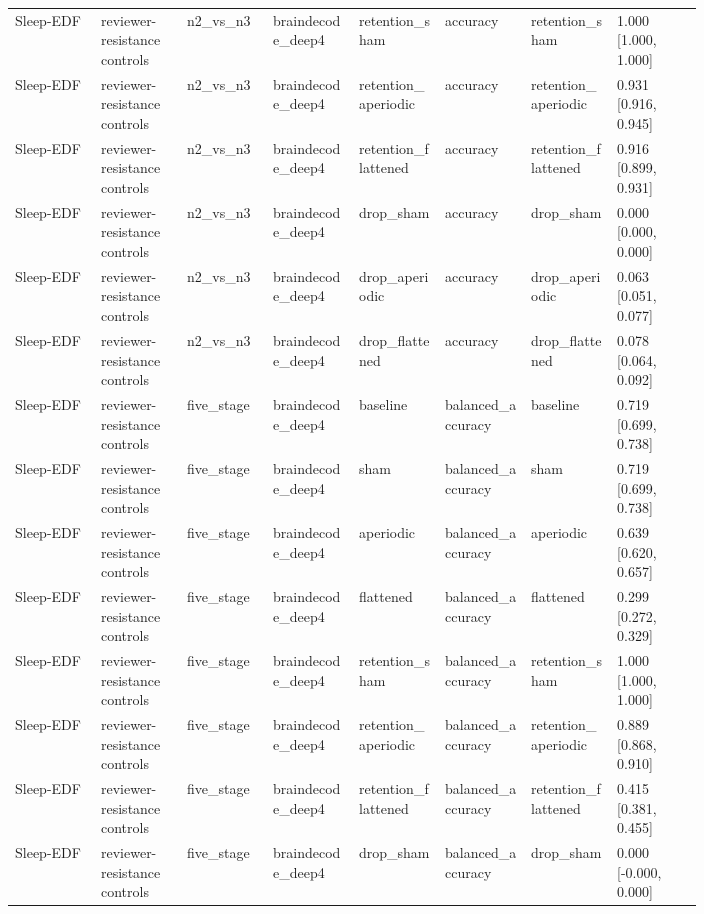 \begin{longtable}{p{0.10\linewidth}p{0.10\linewidth}p{0.10\linewidth}p{0.10\linewidth}p{0.10\linewidth}p{0.10\linewidth}p{0.10\linewidth}p{0.10\linewidth}}
Sleep-EDF & reviewer-resistance controls & n2\_vs\_n3 & braindecode\_deep4 & retention\_sham & accuracy & retention\_sham & 1.000 [1.000, 1.000]\\
Sleep-EDF & reviewer-resistance controls & n2\_vs\_n3 & braindecode\_deep4 & retention\_aperiodic & accuracy & retention\_aperiodic & 0.931 [0.916, 0.945]\\
Sleep-EDF & reviewer-resistance controls & n2\_vs\_n3 & braindecode\_deep4 & retention\_flattened & accuracy & retention\_flattened & 0.916 [0.899, 0.931]\\
Sleep-EDF & reviewer-resistance controls & n2\_vs\_n3 & braindecode\_deep4 & drop\_sham & accuracy & drop\_sham & 0.000 [0.000, 0.000]\\
Sleep-EDF & reviewer-resistance controls & n2\_vs\_n3 & braindecode\_deep4 & drop\_aperiodic & accuracy & drop\_aperiodic & 0.063 [0.051, 0.077]\\
Sleep-EDF & reviewer-resistance controls & n2\_vs\_n3 & braindecode\_deep4 & drop\_flattened & accuracy & drop\_flattened & 0.078 [0.064, 0.092]\\
Sleep-EDF & reviewer-resistance controls & five\_stage & braindecode\_deep4 & baseline & balanced\_accuracy & baseline & 0.719 [0.699, 0.738]\\
Sleep-EDF & reviewer-resistance controls & five\_stage & braindecode\_deep4 & sham & balanced\_accuracy & sham & 0.719 [0.699, 0.738]\\
Sleep-EDF & reviewer-resistance controls & five\_stage & braindecode\_deep4 & aperiodic & balanced\_accuracy & aperiodic & 0.639 [0.620, 0.657]\\
Sleep-EDF & reviewer-resistance controls & five\_stage & braindecode\_deep4 & flattened & balanced\_accuracy & flattened & 0.299 [0.272, 0.329]\\
Sleep-EDF & reviewer-resistance controls & five\_stage & braindecode\_deep4 & retention\_sham & balanced\_accuracy & retention\_sham & 1.000 [1.000, 1.000]\\
Sleep-EDF & reviewer-resistance controls & five\_stage & braindecode\_deep4 & retention\_aperiodic & balanced\_accuracy & retention\_aperiodic & 0.889 [0.868, 0.910]\\
Sleep-EDF & reviewer-resistance controls & five\_stage & braindecode\_deep4 & retention\_flattened & balanced\_accuracy & retention\_flattened & 0.415 [0.381, 0.455]\\
Sleep-EDF & reviewer-resistance controls & five\_stage & braindecode\_deep4 & drop\_sham & balanced\_accuracy & drop\_sham & 0.000 [-0.000, 0.000]\\

\end{longtable}
